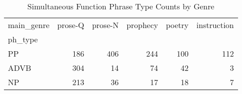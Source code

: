 \begin{table}[htbp!]
\centering
\caption{Simultaneous Function Phrase Type Counts by Genre}
\label{table:simgenph_ct}
\begin{tabular}{lrrrrr}
\toprule
main\_genre &  prose-Q &  prose-N &  prophecy &  poetry &  instruction \\
ph\_type &          &          &           &         &              \\
\midrule
PP      &      186 &      406 &       244 &     100 &          112 \\
ADVB    &      304 &       14 &        74 &      42 &            3 \\
NP      &      213 &       36 &        17 &      18 &            7 \\
\bottomrule
\end{tabular}
\end{table}
